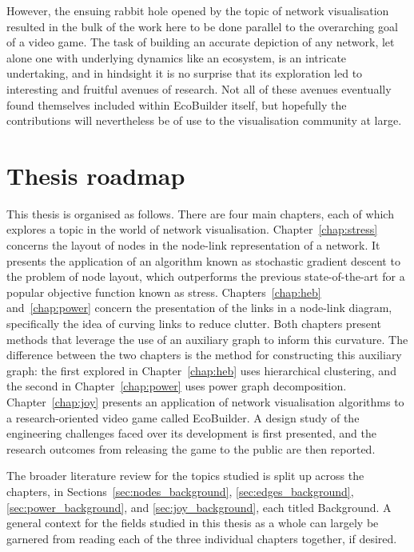However, the ensuing rabbit hole opened by the topic of network visualisation resulted in the bulk of the work here to be done parallel to the overarching goal of a video game. The task of building an accurate depiction of any network, let alone one with underlying dynamics like an ecosystem, is an intricate undertaking, and in hindsight it is no surprise that its exploration led to interesting and fruitful avenues of research.
Not all of these avenues eventually found themselves included within EcoBuilder itself, but hopefully the contributions will nevertheless be of use to the visualisation community at large.

\section{Thesis roadmap}
This thesis is organised as follows. There are four main chapters, each of which explores a topic in the world of network visualisation. Chapter~\ref{chap:stress} concerns the layout of nodes in the node-link representation of a network. It presents the application of an algorithm known as stochastic gradient descent to the problem of node layout, which outperforms the previous state-of-the-art for a popular objective function known as stress.
Chapters~\ref{chap:heb} and~\ref{chap:power} concern the presentation of the links in a node-link diagram, specifically the idea of curving links to reduce clutter. Both chapters present methods that leverage the use of an auxiliary graph to inform this curvature.
The difference between the two chapters is the method for constructing this auxiliary graph: the first explored in Chapter~\ref{chap:heb} uses hierarchical clustering, and the second in Chapter~\ref{chap:power} uses power graph decomposition.
Chapter~\ref{chap:joy} presents an application of network visualisation algorithms to a research-oriented video game called EcoBuilder. A design study of the engineering challenges faced over its development is first presented, and the research outcomes from releasing the game to the public are then reported.

The broader literature review for the topics studied is split up across the chapters, in Sections~\ref{sec:nodes_background}, \ref{sec:edges_background}, \ref{sec:power_background}, and \ref{sec:joy_background}, each titled Background. A general context for the fields studied in this thesis as a whole can largely be garnered from reading each of the three individual chapters together, if desired. 

